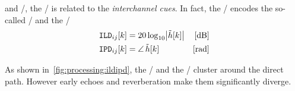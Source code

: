  and \CASA/, the \RTF/ is related to the \textit{interchannel cues}.
In fact, the \RTFs/ encodes the so-called \ILD/ and the \IPD/
\begin{equation}
    \begin{aligned}
        \ild_{ij}[k] &= 20 \log_{10} \magnitudeOf{\rtf[k]} & [\si{\dB}]\\
        \ipd_{ij}[k] &= \phaseOf{\rtf[k]} \mathspace       & [\si{\radian}]
    \end{aligned}
\end{equation}

As shown in~\cref{fig:processing:ildipd}, the \ILD/ and the \IPD/ cluster around the direct path.
However early echoes and reverberation make them significantly diverge.


